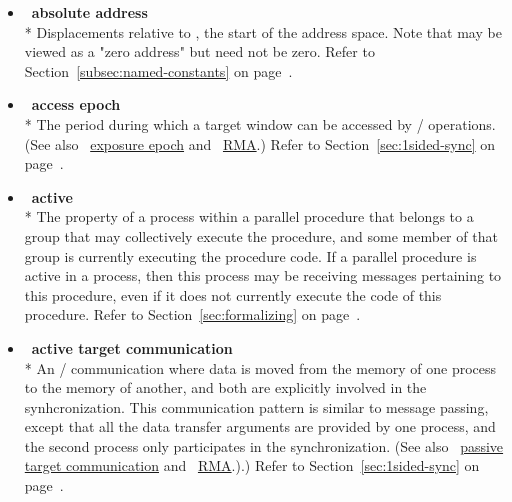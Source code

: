 \begin{itemize}

\label {glossary:absolute_address}
\item  ~\hypertarget{glossary:absolute_address}{\textbf{absolute address}} \\*
Displacements relative to  , 
the start of the address space. Note that  
may be viewed as a "zero address" but need not be zero.
Refer to Section~\ref{subsec:named-constants} on page~\pageref{subsec:named-constants}.

\label{glossary:access_epoch}
\item  ~\hypertarget{glossary:access_epoch}{\textbf{access epoch}} \\*
The period during which a target window can be accessed by \RMA/
operations.
(See also ~\hyperlink{glossary:exposure_epoch}{exposure epoch} and
 ~\hyperlink{glossary:RMA}{RMA}.)
Refer to Section~\ref{sec:1sided-sync} on page~\pageref{sec:1sided-sync}.

\label{glossary:active}
\item  ~\hypertarget{glossary:active}{\textbf{active}} \\*
The property of a process within a parallel procedure that
belongs to a group that may collectively execute the procedure, and
some member of that group is currently executing the procedure code.
If a parallel procedure is active in a process, then this process may
be receiving messages pertaining to this procedure, even if it
does not currently execute the code of this procedure.
Refer to Section~\ref{sec:formalizing} on page~\pageref{sec:formalizing}.

\label{glossary:active_target_communication}
\item  ~\hypertarget{glossary:active_target_communication}{\textbf{active target communication}} \\*
An \RMA/ communication where data is moved from the memory of one
process to the memory of another, and both are explicitly involved in the
synhcronization. This communication pattern is similar to message
passing, except that all the data transfer arguments are provided by
one process, and the second process only participates in the synchronization.
(See also ~\hyperlink{glossary:passive_target_communication}{passive target communication}  and
 ~\hyperlink{glossary:RMA}{RMA}.).)
Refer to Section~\ref{sec:1sided-sync} on page~\pageref{sec:1sided-sync}.


\end{itemize}
